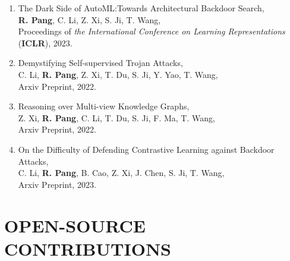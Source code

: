 \documentclass[letterpaper,11pt]{article}
\begin{document}
\begin{enumerate}[labelsep=15pt, parsep=-4pt]
    \item The Dark Side of AutoML:\@ Towards Architectural Backdoor Search,\\
    \textbf{R. Pang}, C. Li, Z. Xi, S. Ji, T. Wang,\\
    Proceedings of {\it the International Conference on Learning Representations\/} (\textbf{ICLR}), 2023.
    
    \item Demystifying Self-supervised Trojan Attacks,\\
    C. Li, \textbf{R. Pang}, Z. Xi, T. Du, S. Ji, Y. Yao, T. Wang,\\
    Arxiv Preprint, 2022.
    
    \item Reasoning over Multi-view Knowledge Graphs,\\
    Z. Xi, \textbf{R. Pang}, C. Li, T. Du, S. Ji, F. Ma, T. Wang,\\
    Arxiv Preprint, 2022.

    \item On the Difficulty of Defending Contrastive Learning against Backdoor Attacks,\\
    C. Li, \textbf{R. Pang}, B. Cao, Z. Xi, J. Chen, S. Ji, T. Wang,\\
    Arxiv Preprint, 2023.

    \end{enumerate}
    

\section{OPEN-SOURCE CONTRIBUTIONS}
\end{document}

